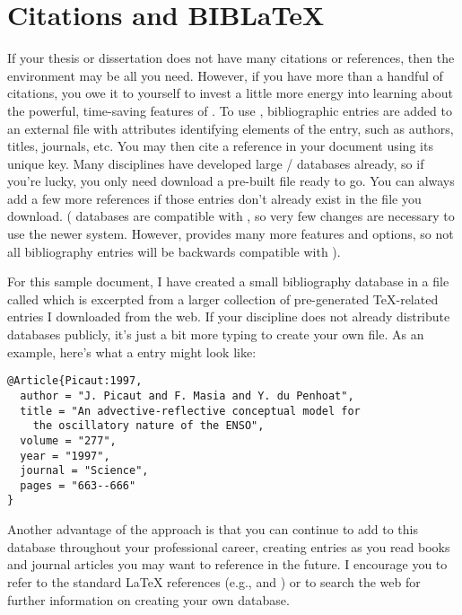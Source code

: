 \section{Citations and B{\small IB}\LaTeX}
If your thesis or dissertation does not have many citations or
references, then the  environment may be all you
need. However, if you have more than a handful of citations, you owe
it to yourself to invest a little more energy into learning about the
powerful, time-saving features of \BibLaTeX.  To use \BibLaTeX,
bibliographic entries are added to an external file with attributes
identifying elements of the entry, such as authors, titles, journals,
etc.  You may then cite a reference in your document using its unique
key.  Many disciplines have developed large \BibTeX/\BibLaTeX{}
databases already, so if you're lucky, you only need download a
pre-built file ready to go.  You can always add a few more references
if those entries don't already exist in the file you
download. (\BibTeX{} databases are compatible with \BibLaTeX{}, so
very few changes are necessary to use the newer system. However,
\BibLaTeX{} provides many more features and options, so not all
\BibLaTeX{} bibliography entries will be backwards compatible with
\BibTeX).

For this sample document, I have created a small \BibLaTeX{}
bibliography database in a file called  which is
excerpted from a larger collection of pre-generated \TeX-related
entries I downloaded from the web.  If your discipline does not
already distribute \BibLaTeX{} databases publicly, it's just a bit more
typing to create your own \BibLaTeX{} file.  As an example, here's
what a \BibLaTeX{} entry might look like:
\begin{verbatim}
@Article{Picaut:1997,                  
  author = "J. Picaut and F. Masia and Y. du Penhoat",
  title = "An advective-reflective conceptual model for
    the oscillatory nature of the ENSO",
  volume = "277",
  year = "1997",
  journal = "Science",
  pages = "663--666"
}
\end{verbatim}

Another advantage of the \BibLaTeX{} approach is that you can continue
to add to this database throughout your professional career, creating
entries as you read books and journal articles you may want to
reference in the future.  I encourage you to refer to the
standard \LaTeX{} references (e.g., \cite{Lamport:1994:LDP}
and \cite{Kopka:2004:GLT}) or to search the web for further
information on creating your own \BibLaTeX{} database.

